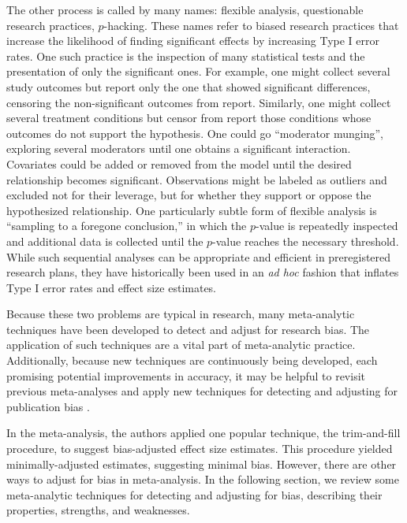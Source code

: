 \documentclass[man]{apa6}
\begin{document}
The other process is called by many names: flexible analysis, questionable research practices, $p$-hacking. These names refer to biased research practices that increase the likelihood of finding significant effects by increasing Type I error rates. One such practice is the inspection of many statistical tests and the presentation of only the significant ones. For example, one might collect several study outcomes but report only the one that showed significant differences, censoring the non-significant outcomes from report. Similarly, one might collect several treatment conditions but censor from report those conditions whose outcomes do not support the hypothesis. One could go ``moderator munging'', exploring several moderators until one obtains a significant interaction. Covariates could be added or removed from the model until the desired relationship becomes significant. Observations might be labeled as outliers and excluded not for their leverage, but for whether they support or oppose the hypothesized relationship. One particularly subtle form of flexible analysis is ``sampling to a foregone conclusion,'' in which the $p$-value is repeatedly inspected and additional data is collected until the $p$-value reaches the necessary threshold. While such sequential analyses can be appropriate and efficient in preregistered research plans, they have historically been used in an {\em ad hoc} fashion that inflates Type I error rates and effect size estimates.

Because these two problems are typical in research, many meta-analytic techniques have been developed to detect and adjust for research bias. The application of such techniques are a vital part of meta-analytic practice. Additionally, because new techniques are continuously being developed, each promising potential improvements in accuracy, it may be helpful to revisit previous meta-analyses and apply new techniques for detecting and adjusting for publication bias \citep{Lakens:etal:inpress}. %

In the \citet{Anderson:etal:2010} meta-analysis, the authors applied one popular technique, the trim-and-fill procedure, to suggest bias-adjusted effect size estimates. This procedure yielded minimally-adjusted estimates, suggesting minimal bias. However, there are other ways to adjust for bias in meta-analysis. In the following section, we review some meta-analytic techniques for detecting and adjusting for bias, describing their properties, strengths, and weaknesses.
\end{document}
